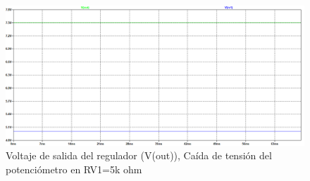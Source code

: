 \begin{enumerate}
\begin{enumerate}
\begin{itemize}
\begin{itemize}
                                    \begin{figure}[H]
                                        \centering
                                        \renewcommand{\figurename}{Gráfica}
                                        \includegraphics[width=15cm]{Imagenes/sim_regulador_sal_ajustable_sinrl2.png}
                                        \caption{Voltaje de salida del regulador (V(out)), Caída de tensión del potenciómetro en RV1=5k ohm}
                                        \label{fig:sim_regulador_sal_ajustable_sinrl2}
                                    \end{figure}
        

\end{itemize}
\end{itemize}
\end{enumerate}
\end{enumerate}
